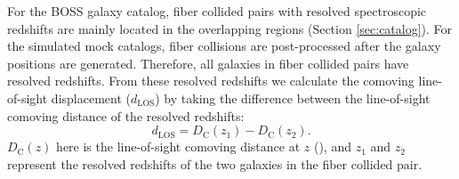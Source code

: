                                                                                                                                                             For the BOSS galaxy catalog, fiber collided pairs with resolved spectroscopic 
                                                                                                                                                            redshifts are mainly located in the overlapping regions (Section \ref{sec:catalog}).
                                                                                                                                                            For the simulated mock catalogs, fiber collisions are post-processed after 
                                                                                                                                                            the galaxy positions are generated. Therefore, 
                                                                                                                                                            all galaxies in fiber collided pairs have resolved redshifts. From these resolved 
                                                                                                                                                            redshifts we calculate the comoving line-of-sight displacement ($d_{\mathrm{LOS}}$) 
                                                                                                                                                            by taking the difference between the line-of-sight comoving distance of the 
                                                                                                                                                            resolved redshifts: 
                                                                                                                                                            \begin{equation}
                                                                                                                                                            d_{\mathrm{LOS}} = D_{\mathrm{C}} (z_1) - D_{\mathrm{C}} (z_2). 
                                                                                                                                                            \end{equation}
                                                                                                                                                            $D_{\mathrm{C}}(z)$ here is the line-of-sight comoving distance at $z$ 
                                                                                                                                                            (\citealt{Hogg:1999aa}), and $z_1$ and $z_2$ represent the resolved redshifts 
                                                                                                                                                            of the two galaxies in the fiber collided pair.

